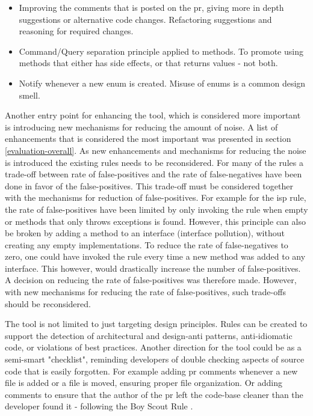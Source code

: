 \documentclass[pdftex,10pt,b5paper,twoside]{report}
\begin{document}
\begin{itemize}
    \item Improving the comments that is posted on the \gls{pr}, giving more in depth suggestions or alternative code changes. Refactoring suggestions and reasoning for required changes.  
    
    \item Command/Query separation principle applied to methods. To promote using methods that either has side effects, or that returns values - not both. 
    
    \item Notify whenever a new enum is created. Misuse of enums is a common design smell.
\end{itemize}


Another entry point for enhancing the tool, which is considered more important is introducing new mechanisms for reducing the amount of noise. A list of enhancements that is considered the most important was presented in section \ref{evaluation-overall}. As new enhancements and mechanisms for reducing the noise is introduced the existing rules needs to be reconsidered. For many of the rules a trade-off between rate of false-positives and the rate of false-negatives have been done in favor of the false-positives. This trade-off must be considered together with the mechanisms for reduction of false-positives. For example for the \gls{isp} rule, the rate of false-positives have been limited by only invoking the rule when empty or methods that only throws exceptions is found. However, this principle can also be broken by adding a method to an interface (interface pollution), without creating any empty implementations. To reduce the rate of false-negatives to zero, one could have invoked the rule every time a new method was added to any interface. This however, would drastically increase the number of false-positives. A decision on reducing the rate of false-positives was therefore made. However, with new mechanisms for reducing the rate of false-positives, such trade-offs should be reconsidered. 

The tool is not limited to just targeting design principles. Rules can be created to support the detection of architectural and design-anti patterns, anti-idiomatic code, or violations of best practices. Another direction for the tool could be as a semi-smart "checklist", reminding developers of double checking aspects of source code that is easily forgotten. For example adding \gls{pr} comments whenever a new file is added or a file is moved, ensuring proper file organization. Or adding comments to ensure that the author of the \gls{pr} left the code-base cleaner than the developer found it - following the Boy Scout Rule \cite{boy-scout}.
\end{document}
